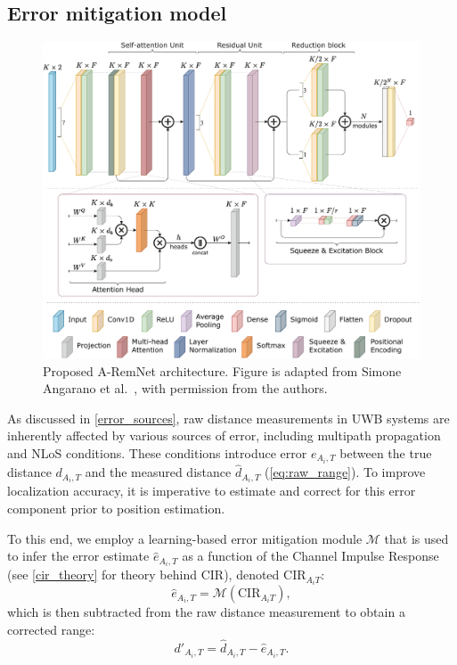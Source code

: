 \subsection{Error mitigation model}

\begin{figure}[tbh]
\includegraphics[width=\textwidth]{Figures/methodology/remnet_compat.pdf}
\centering
\caption[Proposed A-RemNet architecture.]{Proposed A-RemNet architecture. Figure is adapted from Simone Angarano et al.~\cite{Simone2021UWB}, with permission from the authors.}
\label{fig:architecture}
\end{figure}

As discussed in \autoref{error_sources}, raw distance measurements in UWB systems are inherently affected by various sources of error, including multipath propagation and NLoS conditions. These conditions introduce error $e_{A_i,T}$ between the true distance $d_{A_i,T}$ and the measured distance $\hat{d}_{A_i,T}$ (\autoref{eq:raw_range}). To improve localization accuracy, it is imperative to estimate and correct for this error component prior to position estimation. 

To this end, we employ a learning-based error mitigation module $\mathcal{M}$ that is used to infer the error estimate $\hat{e}_{A_i,T}$ as a function of the Channel Impulse Response (see \autoref{cir_theory} for theory behind CIR), denoted $\text{CIR}_{A_iT}$:
\begin{equation}
    \hat{e}_{A_i,T} = \mathcal{M}(\text{CIR}_{A_iT}),
\end{equation}
which is then subtracted from the raw distance measurement to obtain a corrected range:
\begin{equation}
    d'_{A_i,T} = \hat{d}_{A_i,T} - \hat{e}_{A_i,T}.
\end{equation}

